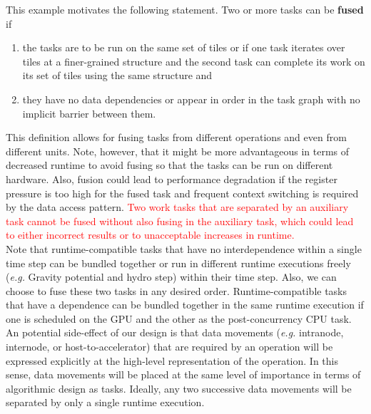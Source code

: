 \documentclass{article}
\begin{document}
This example motivates the following statement.  Two or more tasks can be
\textbf{fused} if
\begin{enumerate}
\item{the tasks are to be run on the same set of tiles or if one task 
iterates over tiles at a finer-grained structure and the second task can
complete its work on its set of tiles using the same structure and}
\item{they have no data dependencies or appear in order in the task graph with
no implicit barrier between them.}
\end{enumerate}
This definition allows for fusing tasks from different operations and even from
different units.
Note, however, that it might be more advantageous in terms of decreased runtime
to avoid fusing so that the tasks can be run on different hardware.  Also,
fusion could lead to performance degradation if the register pressure is too
high for the fused task and frequent context switching is required by the data
access pattern.  \textcolor{red}{Two work tasks that are separated by
an auxiliary task cannot be fused without also fusing in the auxiliary task,
which could lead to either incorrect results or to unacceptable increases in
runtime.}\\

Note that runtime-compatible tasks that have no interdependence within a single
time step can be bundled together or run in different runtime executions freely
(\textit{e.g.} Gravity potential and hydro step) within their time step.  Also,
we can choose to fuse these two tasks in any desired order.  Runtime-compatible
tasks that have a dependence can be bundled together in the same runtime
execution if one is scheduled on the GPU and the other as the 
post-concurrency CPU task.\\

An potential side-effect of our design is that data movements (\textit{e.g.}
intranode, internode, or host-to-accelerator) that are required by an operation
will be expressed explicitly at the high-level representation of the operation.
In this sense, data movements will be placed at the same level of importance in
terms of algorithmic design as tasks.  Ideally, any two successive data
movements will be separated by only a single runtime execution.\\
\end{document}
